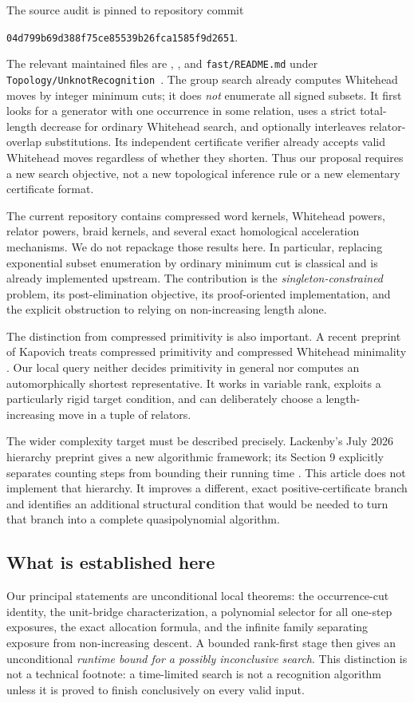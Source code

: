 \documentclass[11pt,letterpaper]{article}
\theoremstyle{definition}\newtheorem{definition}[theorem]{Definition}
\newcommand{\repo}{\texttt{Topology/UnknotRecognition}}
\begin{document}
The source audit is pinned to repository commit
\begin{center}\small\texttt{04d799b69d388f75ce85539b26fca1585f9d2651}.\end{center}
The relevant maintained files are , , and \texttt{fast/README.md} under \repo\ \cite{repo}. The group search already computes Whitehead moves by integer minimum cuts; it does \emph{not} enumerate all signed subsets. It first looks for a generator with one occurrence in some relation, uses a strict total-length decrease for ordinary Whitehead search, and optionally interleaves relator-overlap substitutions. Its independent certificate verifier already accepts valid Whitehead moves regardless of whether they shorten. Thus our proposal requires a new search objective, not a new topological inference rule or a new elementary certificate format.

The current repository contains compressed word kernels, Whitehead powers, relator powers, braid kernels, and several exact homological acceleration mechanisms. We do not repackage those results here. In particular, replacing exponential subset enumeration by ordinary minimum cut is classical \cite{rvw} and is already implemented upstream. The contribution is the \emph{singleton-constrained} problem, its post-elimination objective, its proof-oriented implementation, and the explicit obstruction to relying on non-increasing length alone.

The distinction from compressed primitivity is also important. A recent preprint of Kapovich treats compressed primitivity and compressed Whitehead minimality \cite{kapovich}. Our local query neither decides primitivity in general nor computes an automorphically shortest representative. It works in variable rank, exploits a particularly rigid target condition, and can deliberately choose a length-increasing move in a tuple of relators.

The wider complexity target must be described precisely. Lackenby's July 2026 hierarchy preprint gives a new algorithmic framework; its Section 9 explicitly separates counting steps from bounding their running time \cite{lackenby}. This article does not implement that hierarchy. It improves a different, exact positive-certificate branch and identifies an additional structural condition that would be needed to turn that branch into a complete quasipolynomial algorithm.

\subsection{What is established here}
Our principal statements are unconditional local theorems: the occurrence-cut identity, the unit-bridge characterization, a polynomial selector for all one-step exposures, the exact allocation formula, and the infinite family separating exposure from non-increasing descent. A bounded rank-first stage then gives an unconditional \emph{runtime bound for a possibly inconclusive search}. This distinction is not a technical footnote: a time-limited search is not a recognition algorithm unless it is proved to finish conclusively on every valid input.
\end{document}
